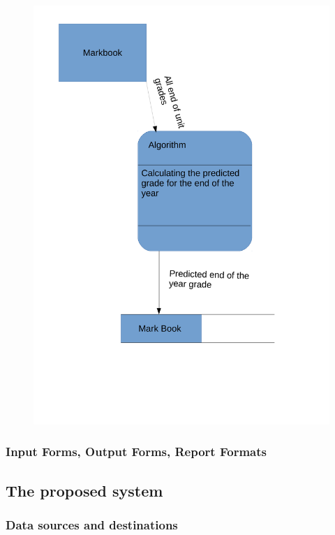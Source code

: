 \begin{algorithm}[H]
\begin{figure}[H]
    \includegraphics[width=\textwidth]{./Analysis/images/DataFlowDiagrams2.pdf}
\end{figure}

\subsubsection{Input Forms, Output Forms, Report Formats}

\subsection{The proposed system}

\subsubsection{Data sources and destinations}


\end{algorithm}
